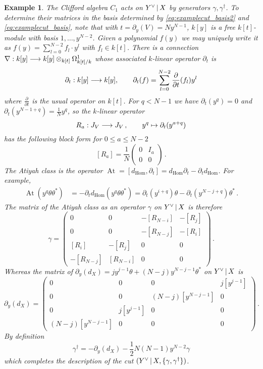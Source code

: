 \documentclass[english,letter paper,12pt,leqno]{article}
\theoremstyle{example}
\newtheorem{example}[theorem]{Example}
\numberwithin{equation}{section}
\def\Hom{\operatorname{Hom}}
\def\ferm{\gamma}
\def\fermc{\gamma^\dagger}
\DeclareMathOperator{\At}{At}
\begin{document}
\begin{example}
The Clifford algebra $C_1$ acts on $Y^{\vee} \,|\, X$ by generators $\ferm, \fermc$. To determine their matrices in the basis determined by \eqref{eq:examplecut_basis2} and \eqref{eq:examplecut_basis}, note that with $t = \partial_y(V) = N y^{N-1}$, $k[y]$ is a free $k[t]$-module with basis $1, \ldots, y^{N-2}$. Given a polynomial $f(y)$ we may uniquely write it as $f(y) = \sum_{l = 0}^{N-2} f_l \cdot y^l$ with $f_l \in k[t]$. There is a connection $\nabla: k[y] \longrightarrow k[y] \otimes_{k[t]} \Omega^1_{k[t]/k}$ whose associated $k$-linear operator $\partial_t$ is
\[
\partial_t: k[y] \longrightarrow k[y], \qquad \partial_t(f) = \sum_{l = 0}^{N-2} \frac{\partial}{\partial t}( f_l ) y^l
\]
where $\frac{\partial}{\partial t}$ is the usual operator on $k[t]$. For $q < N - 1$ we have $\partial_t(y^q) = 0$ and $\partial_t(y^{N-1+q}) = \frac{1}{N} y^q$, so the $k$-linear operator
\[
R_a: J_V \longrightarrow J_V \,, \qquad y^q \mapsto \partial_t( y^{a+q} )
\]
has the following block form for $0 \le a \le N - 2$
\[
[R_a] = \frac{1}{N} \begin{pmatrix} 0 & I_{a} \\ 0 & 0 \end{pmatrix}\,.
\]
The Atiyah class is the operator $\At = [d_{\Hom}, \partial_t] = d_{\Hom} \partial_t - \partial_t d_{\Hom}$. For example,
\begin{align*}
\At( y^q \theta \theta^* ) &= - \partial_t d_{\Hom}( y^q \theta \theta^* ) = \partial_t( y^{i+q} ) \theta - \partial_t( y^{N-j+q} ) \theta^*\,.
\end{align*}
The matrix of the Atiyah class as an operator $\ferm$ on $Y^{\vee} \,|\, X$ is therefore
\begin{equation}\label{eq:aityah_class_hom_example}
\ferm = \begin{pmatrix} 0 & 0 & -[R_{N-i}] & -[R_{j}] \\ 
0 & 0 & -[R_{N-j}] & -[R_{i}] \\
[R_i] & -[R_j] & 0 & 0 \\
-[R_{N-j}] & [R_{N-i}] & 0 & 0 \end{pmatrix}\,.
\end{equation}
Whereas the matrix of $\partial_{y}(d_X) = j y^{j-1} \theta + (N-j) y^{N-j-1} \theta^*$ on $Y^{\vee} \,|\, X$ is
\[
\partial_y(d_X) = \begin{pmatrix} 0 & 0 & 0 & j [y^{j-1}] \\
0 & 0 & (N-j) [y^{N-j-1}] & 0\\
0 & j [y^{j-1}] & 0 & 0\\
(N-j) [y^{N-j-1}] & 0 & 0 & 0\end{pmatrix}\,.
\]
By definition
\[
\fermc = - \partial_y(d_X) - \frac{1}{2} N (N-1) y^{N-2} \ferm
\]
which completes the description of the cut $( Y^{\vee} \l X, \{ \ferm, \fermc \} )$. %
\end{example}
\end{document}
